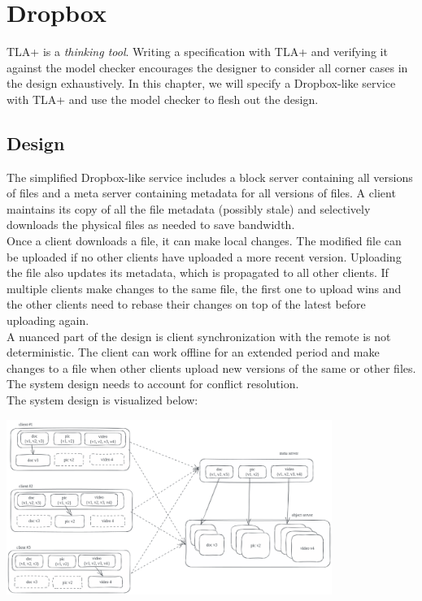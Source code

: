% 

\usetikzlibrary{arrows.meta} %

\chapter{Dropbox}

TLA+ is a \textit{thinking tool}. Writing a specification with TLA+ and
verifying it against the model checker encourages the designer to consider all
corner cases in the design exhaustively. In this chapter, we will specify a
Dropbox-like service with TLA+ and use the model checker to flesh out the
design.\\

\section{Design}

The simplified Dropbox-like service includes a block server containing all
versions of files and a meta server containing metadata for all versions of
files. A client maintains its copy of all the file metadata (possibly stale) and
selectively downloads the physical files as needed to save bandwidth.\\

Once a client downloads a file, it can make local changes. The modified file can
be uploaded if no other clients have uploaded a more recent version. Uploading
the file also updates its metadata, which is propagated to all other clients. If
multiple clients make changes to the same file, the first one to upload wins and
the other clients need to rebase their changes on top of the latest before
uploading again.\\

A nuanced part of the design is client synchronization with the remote is not
deterministic. The client can work offline for an extended period and make
changes to a file when other clients upload new versions of the same or other
files. The system design needs to account for conflict resolution.\\

The system design is visualized below:\\

\begin{center}
\includegraphics[width=300pt]{dropbox}
\end{center}

